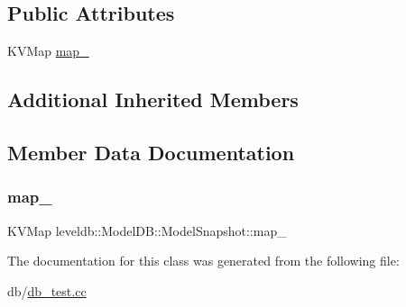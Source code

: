 \subsection*{Public Attributes}
\begin{DoxyCompactItemize}
\item 
K\+V\+Map \mbox{\hyperlink{classleveldb_1_1_model_d_b_1_1_model_snapshot_a7ae02397c293072b78874d0c073a10c5}{map\+\_\+}}
\end{DoxyCompactItemize}
\subsection*{Additional Inherited Members}


\subsection{Member Data Documentation}
\mbox{\label{classleveldb_1_1_model_d_b_1_1_model_snapshot_a7ae02397c293072b78874d0c073a10c5}} 
\subsubsection{\texorpdfstring{map\_}{map\_}}
{\footnotesize\ttfamily K\+V\+Map leveldb\+::\+Model\+D\+B\+::\+Model\+Snapshot\+::map\+\_\+}



The documentation for this class was generated from the following file\+:\begin{DoxyCompactItemize}
\item 
db/\mbox{\hyperlink{db__test_8cc}{db\+\_\+test.\+cc}}\end{DoxyCompactItemize}
